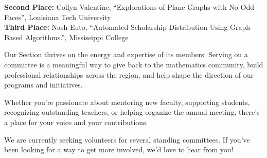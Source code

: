 \documentclass[10pt]{article} %
\begin{document}
\begin{minipage}[t]{.95\linewidth}
\begin{adjustbox}{minipage=.5\textwidth,valign=T}
    \textbf{Second Place:} Collyn Valentine, ``Explorations of Plane Graphs with No Odd Faces'', Louisiana Tech University\\
    
    \textbf{Third Place:} Nash Euto, ``Automated Scholarship Distribution Using Graph-Based Algorithms.'', Mississippi College  
  \end{adjustbox}\hfill
  \\
  
  
  \BackToContents %
\end{minipage}

\begin{minipage}[t]{\linewidth}
  \hypertarget{volunteers}{}
    Our Section thrives on the energy and expertise of its members.
    Serving on a committee is a meaningful way to give back to the mathematics community, build professional relationships across the region, and help shape the direction of our programs and initiatives.

    Whether you’re passionate about mentoring new faculty, supporting students, recognizing outstanding teachers, or helping organize the annual meeting, there’s a place for your voice and your contributions.

    We are currently seeking volunteers for several standing committees.
    If you’ve been looking for a way to get more involved, we’d love to hear from you!
    
    \BackToContents %



  \begin{minipage}{.5\textwidth}
    \begin{mdframed}[style=intextbox,frametitle={}] %


\end{mdframed}
\end{minipage}
\end{minipage}
\end{document}
